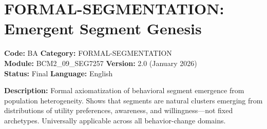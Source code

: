 %
%
%
%
%

\chapter{FORMAL-SEGMENTATION: Emergent Segment Genesis}
\label{app:formal-segmentation}
\label{app:ba-segments}


\begin{tcolorbox}[colback=gray!5!white, colframe=gray!75!black,
    title=Appendix BA: Header Block]

\noindent
\textbf{Code:} BA \quad \textbf{Category:} FORMAL-SEGMENTATION \\
\textbf{Module:} BCM2\_09\_SEG7257 \quad \textbf{Version:} 2.0 (January 2026) \\
\textbf{Status:} Final \quad \textbf{Language:} English

\vspace{0.5em}

\noindent
\textbf{Description:}
Formal axiomatization of behavioral segment emergence from population heterogeneity. Shows that segments are natural clusters emerging from distributions of utility preferences, awareness, and willingness—not fixed archetypes. Universally applicable across all behavior-change domains.

\end{tcolorbox}

